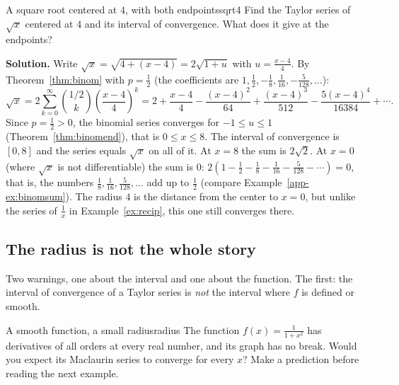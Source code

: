 \documentclass[11pt]{article}
\begin{document}
\begin{exmp}{A square root centered at $4$, with both endpoints}{sqrt4}
Find the Taylor series of $\sqrt x$ centered at $4$ and its interval of convergence. What does it give at the endpoints?

\textbf{Solution.} Write $\sqrt x=\sqrt{4+(x-4)}=2\sqrt{1+u}$ with $u=\frac{x-4}4$. By Theorem~\ref{thm:binom} with $p=\frac12$ (the coefficients are $1,\frac12,-\frac18,\frac1{16},-\frac5{128},\dots$):
\[
\sqrt x=2\sum_{k=0}^\infty\binom{1/2}k\left(\frac{x-4}4\right)^k=2+\frac{x-4}4-\frac{(x-4)^2}{64}+\frac{(x-4)^3}{512}-\frac{5(x-4)^4}{16384}+\cdots .
\]
Since $p=\frac12>0$, the binomial series converges for $-1\le u\le1$ (Theorem~\ref{thm:binomend}), that is $0\le x\le8$. The interval of convergence is $[0,8]$ and the series equals $\sqrt x$ on all of it. At $x=8$ the sum is $2\sqrt2$. At $x=0$ (where $\sqrt x$ is not differentiable) the sum is $0$: $2\left(1-\frac12-\frac18-\frac1{16}-\frac5{128}-\cdots\right)=0$, that is, the numbers $\frac18,\frac1{16},\frac5{128},\dots$ add up to $\frac12$ (compare Example~\ref{app-ex:binomsum}). The radius $4$ is the distance from the center to $x=0$, but unlike the series of $\frac1x$ in Example~\ref{ex:recip}, this one still converges there.
\end{exmp}

\subsection*{The radius is not the whole story}

Two warnings, one about the interval and one about the function. The first: the interval of convergence of a Taylor series is \emph{not} the interval where $f$ is defined or smooth.

\begin{think}{A smooth function, a small radius}{radius}
The function $f(x)=\frac1{1+x^2}$ has derivatives of all orders at every real number, and its graph has no break. Would you expect its Maclaurin series to converge for every $x$? Make a prediction before reading the next example.
\end{think}
\end{document}
